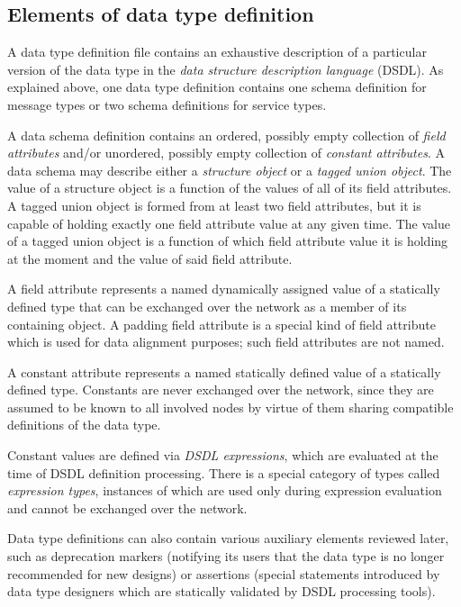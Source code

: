 \subsection{Elements of data type definition}

A data type definition file contains an exhaustive description of a particular version of the data type in the
\emph{data structure description language} (DSDL).
As explained above, one data type definition contains one schema definition for message types or two schema definitions for service types.

A data schema definition contains an ordered, possibly empty collection of \emph{field attributes} and/or
unordered, possibly empty collection of \emph{constant attributes}.
A data schema may describe either a \emph{structure object} or a \emph{tagged union object}.
The value of a structure object is a function of the values of all of its field attributes.
A tagged union object is formed from at least two field attributes,
but it is capable of holding exactly one field attribute value at any given time.
The value of a tagged union object is a function of which field attribute value
it is holding at the moment and the value of said field attribute.

A field attribute represents a named dynamically assigned value of a statically defined type
that can be exchanged over the network as a member of its containing object.
A padding field attribute is a special kind of field attribute which is used for data alignment purposes;
such field attributes are not named.

A constant attribute represents a named statically defined value of a statically defined type.
Constants are never exchanged over the network, since they are assumed to be known to all involved nodes
by virtue of them sharing compatible definitions of the data type.

Constant values are defined via \emph{DSDL expressions},
which are evaluated at the time of DSDL definition processing.
There is a special category of types called \emph{expression types},
instances of which are used only during expression evaluation
and cannot be exchanged over the network.

Data type definitions can also contain various auxiliary elements reviewed later,
such as deprecation markers (notifying its users that the data type is no longer recommended for new designs)
or assertions (special statements introduced by data type designers
which are statically validated by DSDL processing tools).

